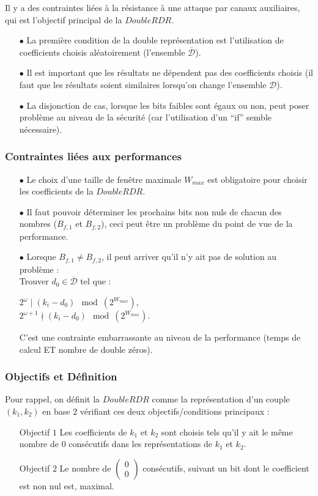 \documentclass[12pt, a4paper]{memoir}
\newcommand{\doublezero}{\begin{pmatrix} 0 \\ 0 \end{pmatrix}}
\newcommand{\dbarre}{\overline{\mathcal{D}}}
\begin{document}
Il y a des contraintes liées à la résistance à une attaque par canaux auxiliaires, qui est l'objectif principal de la $DoubleRDR$.
\begin{itemize}
 \item [$\bullet$] La première condition de la double représentation est l'utilisation de coefficients choisis aléatoirement (l'ensemble $\overline{\mathcal{D}}$).
 \item [$\bullet$] Il est important que les résultats ne dépendent pas des coefficients choisis (il faut que 
 les résultats soient similaires lorsqu'on change l'ensemble $\mathcal{D}$).
 \item [$\bullet$] La disjonction de cas, lorsque les bits faibles sont égaux ou non, peut poser problème
 au niveau de la sécurité (car l'utilisation d'un ``if'' semble nécessaire).
 \end{itemize}

\subsubsection{Contraintes liées aux performances}

 
\begin{itemize}
 \item [$\bullet$] Le choix d'une taille de fenêtre maximale $W_{max}$ est obligatoire pour choisir les 
 coefficients de la $DoubleRDR$.
 \item [$\bullet$] Il faut pouvoir déterminer les prochains bits non nuls de chacun des nombres ($B_{f,1}$ et $B_{f,2}$), 
 ceci peut être un problème du point de vue de la performance.
 \item [$\bullet$] Lorsque $B_{f,1} \neq B_{f,2}$, il peut arriver qu'il n'y ait pas de solution au problème : \\
    Trouver $d_0 \in \dbarre$ tel que :
   \begin{center}
    $2^{\omega} \mid (k_i - d_0) \mod (2^{W_{max}})$, \\
    $2^{\omega+1} \nmid (k_i - d_0) \mod (2^{W_{max}})$.
   \end{center}
 C'est une contrainte embarrassante au niveau de la performance (temps de calcul ET nombre de double zéros).
\end{itemize}

\subsubsection{Objectifs et Définition}

Pour rappel, on définit la $DoubleRDR$ comme la représentation d'un couple $(k_1 , k_2)$ en base $2$ 
vérifiant ces deux objectifs/conditions principaux :
\begin{itemize}
 \item [Objectif $1$] Les coefficients de $k_1$ et $k_2$ sont choisis tels qu'il y ait le même nombre de $0$
 consécutifs dans les représentations de $k_1$ et $k_2$.
 \item [Objectif $2$] Le nombre de $\doublezero$ consécutifs, suivant un bit dont le coefficient est non nul est, maximal. 
\end{itemize}
\end{document}
